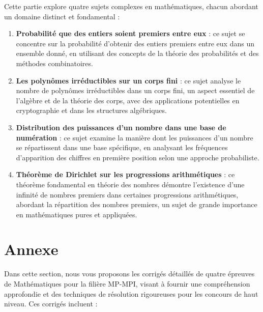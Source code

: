 \documentclass[a4paper,11pt]{article}
\begin{document}
Cette partie explore quatre sujets complexes en math{\'e}matiques, chacun
abordant un domaine distinct et fondamental :
\begin{enumerate}
  \item {\textbf{Probabilit{\'e} que des entiers soient premiers entre eux}}
  : ce sujet se concentre sur la probabilit{\'e} d'obtenir des entiers
  premiers entre eux dans un ensemble donn{\'e}, en utilisant des concepts de
  la th{\'e}orie des probabilit{\'e}s et des m{\'e}thodes combinatoires.
  
  \item {\textbf{Les polyn{\^o}mes irr{\'e}ductibles sur un corps fini}} :
  ce sujet analyse le nombre de polyn{\^o}mes irr{\'e}ductibles dans un corps
  fini, un aspect essentiel de l'alg{\`e}bre et de la th{\'e}orie des corps,
  avec des applications potentielles en cryptographie et dans les structures
  alg{\'e}briques.
  
  \item {\textbf{Distribution des puissances d'un nombre dans une base de
  num{\'e}ration}} : ce sujet examine la mani{\`e}re dont les puissances d'un
  nombre se r{\'e}partissent dans une base sp{\'e}cifique, en analysant les
  fr{\'e}quences d'apparition des chiffres en premi{\`e}re position selon une
  approche probabiliste.
  
  \item {\textbf{Th{\'e}or{\`e}me de Dirichlet sur les progressions
  arithm{\'e}tiques}} : ce th{\'e}or{\`e}me fondamental en th{\'e}orie des
  nombres d{\'e}montre l'existence d'une infinit{\'e} de nombres premiers dans
  certaines progressions arithm{\'e}tiques, abordant la r{\'e}partition des
  nombres premiers, un sujet de grande importance en math{\'e}matiques pures
  et appliqu{\'e}es.
\end{enumerate}
\newpage

\newpage

\newpage

\newpage


\newpage
\part{Annexe}
Dans cette section, nous vous proposons les corrig{\'e}s d{\'e}taill{\'e}s de
quatre {\'e}preuves de Math{\'e}matiques pour la fili{\`e}re MP-MPI, visant
{\`a} fournir une compr{\'e}hension approfondie et des techniques de
r{\'e}solution rigoureuses pour les concours de haut niveau. Ces corrig{\'e}s
incluent :
\end{document}
